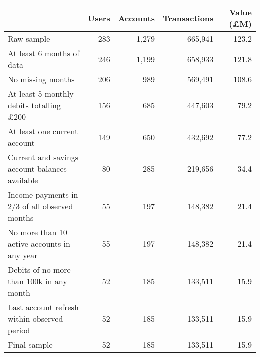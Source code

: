 \begin{tabular}{lrrrr}
\toprule
                                               & Users & Accounts & Transactions & Value (\pounds M) \\
\midrule
                                    Raw sample &   283 &    1,279 &      665,941 &             123.2 \\
                     At least 6 months of data &   246 &    1,199 &      658,933 &             121.8 \\
                             No missing months &   206 &      989 &      569,491 &             108.6 \\
At least 5 monthly debits totalling \pounds200 &   156 &      685 &      447,603 &              79.2 \\
                  At least one current account &   149 &      650 &      432,692 &              77.2 \\
Current and savings account balances available &    80 &      285 &      219,656 &              34.4 \\
 Income payments in 2/3 of all observed months &    55 &      197 &      148,382 &              21.4 \\
   No more than 10 active accounts in any year &    55 &      197 &      148,382 &              21.4 \\
      Debits of no more than 100k in any month &    52 &      185 &      133,511 &              15.9 \\
   Last account refresh within observed period &    52 &      185 &      133,511 &              15.9 \\
                                  Final sample &    52 &      185 &      133,511 &              15.9 \\
\bottomrule
\end{tabular}
